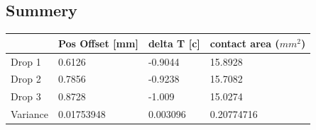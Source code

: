 \subsection{Summery}

\begin{table}[h]
    \centering
    \begin{tabular}{|l|l|l|l|}
    \hline
             & Pos Offset {[}mm{]} & delta T {[}c{]} & contact area ($mm^2$)  \\ \hline
    Drop 1   & 0.6126              & -0.9044         & 15.8928                               \\ \hline
    Drop 2   & 0.7856              & -0.9238         & 15.7082                               \\ \hline
    Drop 3   & 0.8728              & -1.009          & 15.0274                               \\ \hline
    Variance & 0.01753948          & 0.003096        & 0.20774716   \\ \hline
    \end{tabular}
    \end{table}

